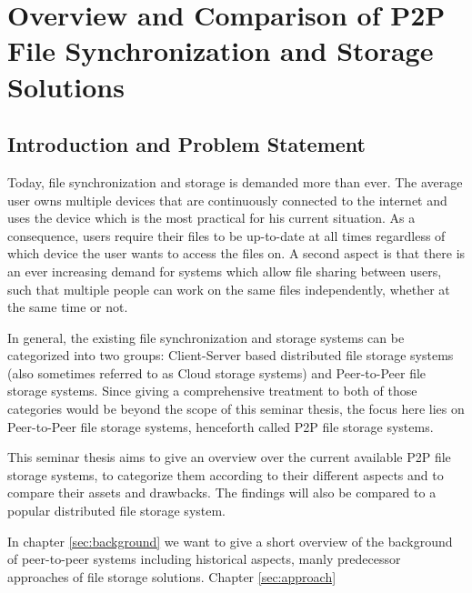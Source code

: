 \chapter{Overview and Comparison of P2P File Synchronization and Storage Solutions}


\newpage

\minitoc

\newpage

\section{Introduction and Problem Statement}
Today, file synchronization and storage is demanded more than ever. The average user owns multiple devices that are continuously connected to the internet and uses the device which is the most practical for his current situation. As a consequence, users require their files to be up-to-date at all times regardless of which device the user wants to access the files on. A second aspect is that there is an ever increasing demand for systems which allow file sharing between users, such that multiple people can work on the same files independently, whether at the same time or not.

In general, the existing file synchronization and storage systems can be categorized into two groups: Client-Server based distributed file storage systems (also sometimes referred to as Cloud storage systems) and Peer-to-Peer file storage systems. Since giving a comprehensive treatment to both of those categories would be beyond the scope of this seminar thesis, the focus here lies on Peer-to-Peer file storage systems, henceforth called P2P file storage systems.

This seminar thesis aims to give an overview over the current available P2P file storage systems, to categorize them according to their different aspects and to compare their assets and drawbacks. The findings will also be compared to a popular distributed file storage system.

In chapter \ref{sec:background} we want to give a short overview  of the background of peer-to-peer systems including historical aspects, manly predecessor approaches of file storage solutions. Chapter \ref{sec:approach}

